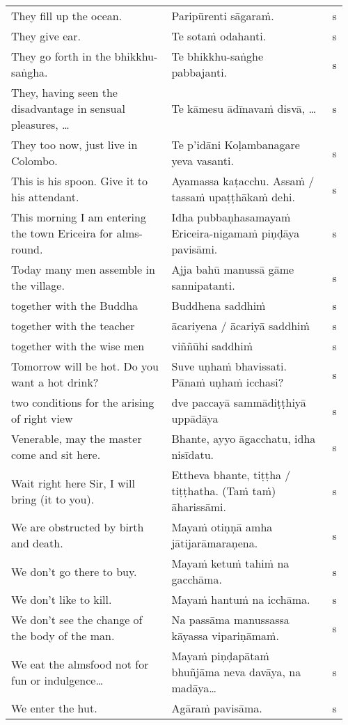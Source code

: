 \documentclass[a5paper]{memoir}
\begin{document}
\begin{longtable}{L{0.48\linewidth} L{0.48\linewidth} H}
They fill up the ocean. & Paripūrenti sāgaraṁ. & s\\[0pt]
They give ear. & Te sotaṁ odahanti. & s\\[0pt]
They go forth in the bhikkhu-saṅgha. & Te bhikkhu-saṅghe pabbajanti. & s\\[0pt]
They, having seen the disadvantage in sensual pleasures, \ldots{} & Te kāmesu ādīnavaṁ disvā, \ldots{} & s\\[0pt]
They too now, just live in Colombo. & Te p'idāni Koḷambanagare yeva vasanti. & s\\[0pt]
This is his spoon. Give it to his attendant. & Ayamassa kaṭacchu. Assaṁ / tassaṁ upaṭṭhākaṁ dehi. & s\\[0pt]
This morning I am entering the town Ericeira for alms-round. & Idha pubbaṇhasamayaṁ Ericeira-nigamaṁ piṇḍāya pavisāmi. & s\\[0pt]
Today many men assemble in the village. & Ajja bahū manussā gāme sannipatanti. & s\\[0pt]
together with the Buddha & Buddhena saddhiṁ & s\\[0pt]
together with the teacher & ācariyena / ācariyā saddhiṁ & s\\[0pt]
together with the wise men & viññūhi saddhiṁ & s\\[0pt]
Tomorrow will be hot. Do you want a hot drink? & Suve uṇhaṁ bhavissati. Pānaṁ uṇhaṁ icchasi? & s\\[0pt]
two conditions for the arising of right view & dve paccayā sammādiṭṭhiyā uppādāya & s\\[0pt]
Venerable, may the master come and sit here. & Bhante, ayyo āgacchatu, idha nisīdatu. & s\\[0pt]
Wait right here Sir, I will bring (it to you). & Ettheva bhante, tiṭṭha / tiṭṭhatha. (Taṁ taṁ) āharissāmi. & s\\[0pt]
We are obstructed by birth and death. & Mayaṁ otiṇṇā amha jātijarāmaraṇena. & s\\[0pt]
We don't go there to buy. & Mayaṁ ketuṁ tahiṁ na gacchāma. & s\\[0pt]
We don't like to kill. & Mayaṁ hantuṁ na icchāma. & s\\[0pt]
We don't see the change of the body of the man. & Na passāma manussassa kāyassa vipariṇāmaṁ. & s\\[0pt]
We eat the almsfood not for fun or indulgence\ldots{} & Mayaṁ piṇḍapātaṁ bhuñjāma neva davāya, na madāya\ldots{} & s\\[0pt]
We enter the hut. & Agāraṁ pavisāma. & s\\[0pt]

\end{longtable}
\end{document}
